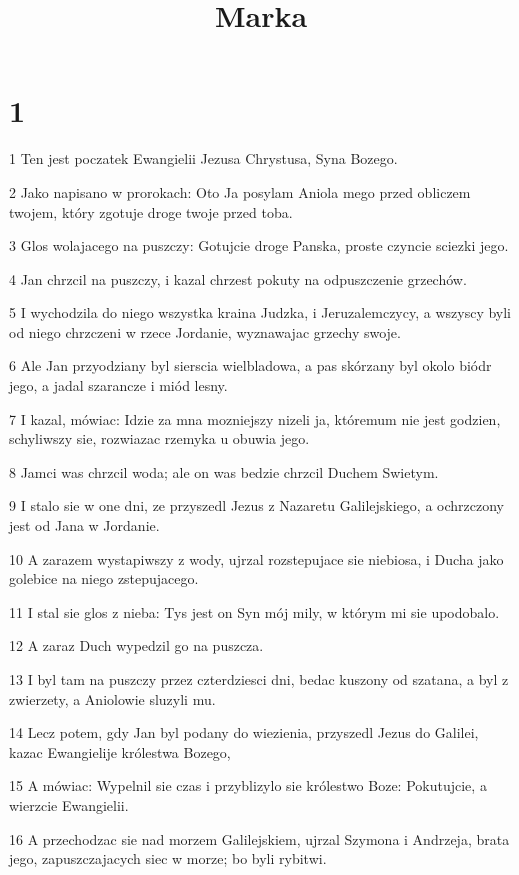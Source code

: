 

\title{Marka}


\chapter{1}

\par 1 Ten jest poczatek Ewangielii Jezusa Chrystusa, Syna Bozego.
\par 2 Jako napisano w prorokach: Oto Ja posylam Aniola mego przed obliczem twojem, który zgotuje droge twoje przed toba.
\par 3 Glos wolajacego na puszczy: Gotujcie droge Panska, proste czyncie sciezki jego.
\par 4 Jan chrzcil na puszczy, i kazal chrzest pokuty na odpuszczenie grzechów.
\par 5 I wychodzila do niego wszystka kraina Judzka, i Jeruzalemczycy, a wszyscy byli od niego chrzczeni w rzece Jordanie, wyznawajac grzechy swoje.
\par 6 Ale Jan przyodziany byl sierscia wielbladowa, a pas skórzany byl okolo biódr jego, a jadal szarancze i miód lesny.
\par 7 I kazal, mówiac: Idzie za mna mozniejszy nizeli ja, któremum nie jest godzien, schyliwszy sie, rozwiazac rzemyka u obuwia jego.
\par 8 Jamci was chrzcil woda; ale on was bedzie chrzcil Duchem Swietym.
\par 9 I stalo sie w one dni, ze przyszedl Jezus z Nazaretu Galilejskiego, a ochrzczony jest od Jana w Jordanie.
\par 10 A zarazem wystapiwszy z wody, ujrzal rozstepujace sie niebiosa, i Ducha jako golebice na niego zstepujacego.
\par 11 I stal sie glos z nieba: Tys jest on Syn mój mily, w którym mi sie upodobalo.
\par 12 A zaraz Duch wypedzil go na puszcza.
\par 13 I byl tam na puszczy przez czterdziesci dni, bedac kuszony od szatana, a byl z zwierzety, a Aniolowie sluzyli mu.
\par 14 Lecz potem, gdy Jan byl podany do wiezienia, przyszedl Jezus do Galilei, kazac Ewangielije królestwa Bozego,
\par 15 A mówiac: Wypelnil sie czas i przyblizylo sie królestwo Boze: Pokutujcie, a wierzcie Ewangielii.
\par 16 A przechodzac sie nad morzem Galilejskiem, ujrzal Szymona i Andrzeja, brata jego, zapuszczajacych siec w morze; bo byli rybitwi.
